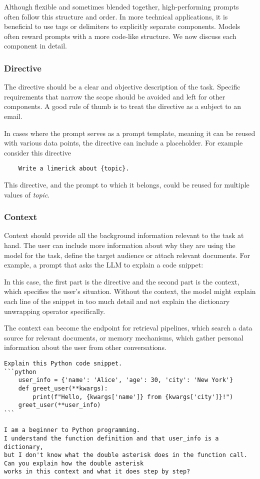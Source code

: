 Although flexible and sometimes blended together, high-performing prompts often follow this structure and order. 
In more technical applications, it is beneficial to use tags or delimiters to explicitly separate components.
Models often reward prompts with a more code-like structure\cite{10.1145/3544548.3581388}. 
We now discuss each component in detail.

\subsubsection{Directive}
The directive should be a clear and objective description of the task. 
Specific requirements that narrow the scope should be avoided and left for other components.
A good rule of thumb is to treat the directive as a subject to an email. 

In cases where the prompt serves as a prompt template, meaning it can be reused with various data points,
the directive can include a placeholder. For example consider this directive
\begin{verbatim}
    Write a limerick about {topic}.
\end{verbatim}
This directive, and the prompt to which it belongs, could be reused for multiple values of \textit{topic}.

\subsubsection{Context}
Context should provide all the background information relevant to the task at hand.
The user can include more information about why they are using the model for the task,
define the target audience or attach relevant documents. For example, a prompt that asks the LLM to explain a code snippet:

In this case, the first part is the directive and the second part is the context, which specifies the user's situation.
Without the context, the model might explain each line of the snippet in too much detail and not explain the dictionary unwrapping operator specifically.

The context can become the endpoint for retrieval pipelines, which search a data source for 
relevant documents, or memory mechanisms, which gather personal information about the user from other conversations. 
\begin{verbatim}
Explain this Python code snippet.
```python
    user_info = {'name': 'Alice', 'age': 30, 'city': 'New York'}
    def greet_user(**kwargs):
        print(f"Hello, {kwargs['name']} from {kwargs['city']}!")
    greet_user(**user_info)
```

I am a beginner to Python programming. 
I understand the function definition and that user_info is a dictionary, 
but I don't know what the double asterisk does in the function call. 
Can you explain how the double asterisk 
works in this context and what it does step by step?
\end{verbatim} 

